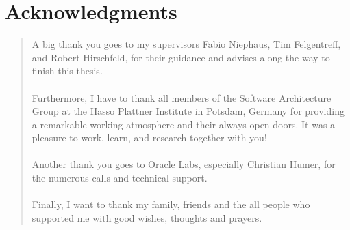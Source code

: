 \begingroup
\let\raggedsection\centering

\chapter*{Acknowledgments}
\label{cha:acknowledgments}
\endgroup
\begin{quotation}
  \noindent A big thank you goes to my supervisors Fabio Niephaus, Tim Felgentreff, and Robert Hirschfeld, for their guidance and advises along the way to finish this thesis.
  \\
  \\Furthermore, I have to thank all members of the Software Architecture Group at the Hasso Plattner Institute in Potsdam, Germany for providing a remarkable working atmosphere and their always open doors. It was a pleasure to work, learn, and research together with you!
  \\
  \\Another thank you goes to Oracle Labs, especially Christian Humer, for the numerous calls and technical support.
  \\
  \\Finally, I want to thank my family, friends and the all people who supported me with good wishes, thoughts and prayers.
\end{quotation}

